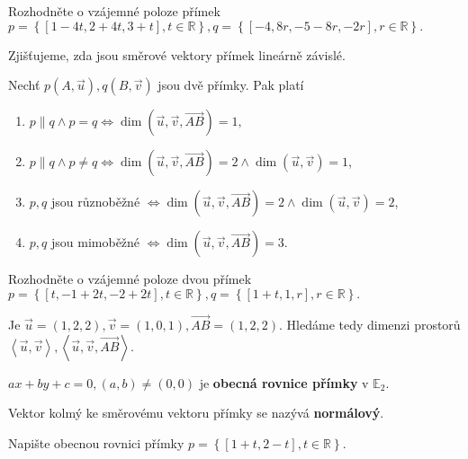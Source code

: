 \begin{priklad}
Rozhodněte o vzájemné poloze přímek $p=\left \{ [1-4t,2+4t,3+t], t \in \mathbb R \right \},q=\left \{ [-4,8r,-5-8r,-2r],r \in \mathbb R \right \} . $
\end{priklad}

\begin{reseni}
Zjišťujeme, zda jsou směrové vektory přímek lineárně závislé.
\end{reseni}

\begin{veta}
    Nechť $p(A,\vec u), q(B, \vec v)$ jsou dvě přímky. Pak platí
    \begin{enumerate}[$i.$]
    \item $p\parallel q \land p=q \iff \dim(\vec u, \vec v, \overrightarrow{AB})=1,$
   	\item $p\parallel q \land p\ne q \iff \dim(\vec u, \vec v, \overrightarrow{AB})=2 \land \dim ( \vec u, \vec v) = 1$,
    \item $p, q$ jsou různoběžné $ \iff \dim(\vec u, \vec v, \overrightarrow{AB})=2 \land \dim ( \vec u, \vec v) = 2$,
    \item $p, q$ jsou mimoběžné $\iff \dim(\vec u, \vec v, \overrightarrow{AB})=3.$
    \end{enumerate}
\end{veta}

\begin{priklad}
Rozhodněte o vzájemné poloze dvou přímek $p=\left \{ [t,-1+2t,-2+2t], t \in \mathbb R \right \}, q=\left \{ [1+t,1,r], r \in \mathbb R \right \}.  $
\end{priklad}

\begin{reseni}
Je $\vec u = (1,2,2), \vec v = (1,0,1), \overrightarrow{AB}=(1,2,2).$ Hledáme tedy
dimenzi prostorů $\left < \vec u, \vec v \right >, \left < \vec u, \vec v, \overrightarrow{AB} \right >.  $
\end{reseni}

\begin{definition}
    $ax+by+c=0, (a,b)\ne(0,0)$ je \textbf{obecná rovnice přímky} v $\mathbb E_2$.
\end{definition}

\begin{definition}
    Vektor kolmý ke směrovému vektoru přímky se nazývá \textbf{normálový}.
\end{definition}

\begin{priklad}
Napište obecnou rovnici přímky $p=\left \{ [1+t,2-t], t \in \mathbb R \right \} .$
\end{priklad}

